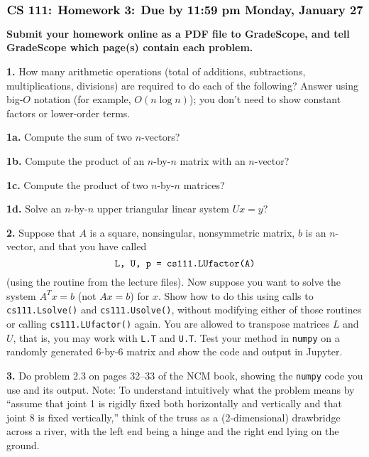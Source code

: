 \documentclass[11pt]{article}
\begin{document}
$$\mbox{\Large \bf CS 111: Homework 3: Due by 11:59 pm Monday, January 27}$$
\par\bigskip\noindent
{\bf Submit your homework online as a PDF file to GradeScope,
and tell GradeScope which page(s) contain each problem.}

\par\bigskip
{\bf 1.}
How many arithmetic operations 
(total of additions, subtractions, multiplications, divisions)
are required to do each of the following?
Answer using big-$O$ notation (for example, $O(n\log n)$); 
you don't need to show constant factors or lower-order terms.

\par\medskip
{\bf 1a.} Compute the sum of two $n$-vectors?

\par\medskip
{\bf 1b.} Compute the product of an $n$-by-$n$ matrix with an $n$-vector?

\par\medskip
{\bf 1c.} Compute the product of two $n$-by-$n$ matrices?

\par\medskip
{\bf 1d.} Solve an $n$-by-$n$ upper triangular linear system $Ux=y$?

\par\bigskip
{\bf 2.}
Suppose that $A$ is a square, nonsingular, nonsymmetric matrix, 
$b$ is an $n$-vector, and that you have called 
$$\mbox{\tt L, U, p = cs111.LUfactor(A)}$$
(using the routine from the lecture files).
Now suppose you want to solve the system $A^Tx=b$ (not $Ax=b$) for $x$.
Show how to do this using calls to {\tt cs111.Lsolve()} 
and {\tt cs111.Usolve()},
without modifying either of those routines 
or calling {\tt cs111.LUfactor()} again.
You are allowed to transpose matrices $L$ and $U$, that is, 
you may work with {\tt L.T} and {\tt U.T}.
Test your method in {\tt numpy} on a randomly generated 6-by-6 matrix
and show the code and output in Jupyter.

\par\bigskip
{\bf 3.} Do problem 2.3 on pages 32--33 of the NCM book, 
showing the {\tt numpy} code you use and its output. 
Note: To understand intuitively what the problem means by 
``assume that joint 1 is rigidly fixed both horizontally and vertically 
and that joint 8 is fixed vertically,'' 
think of the truss as a (2-dimensional) drawbridge across a river, 
with the left end being a hinge and the right end lying on the ground.
\end{document}
